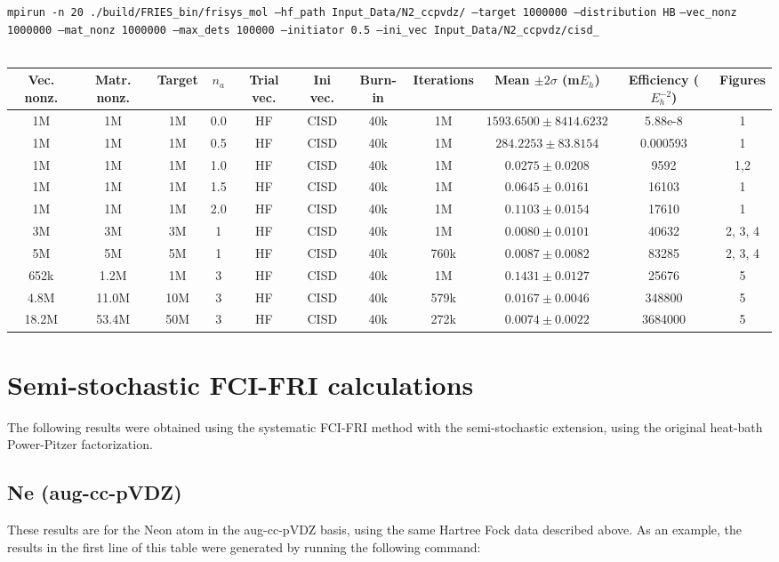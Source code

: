 \documentclass[12pt, landscape]{article}
\begin{document}
\texttt{mpirun -n 20 ./build/FRIES\_bin/frisys\_mol --hf\_path Input\_Data/N2\_ccpvdz/ --target 1000000 --distribution HB} \texttt{--vec\_nonz 1000000 --mat\_nonz 1000000 --max\_dets 100000 --initiator 0.5 --ini\_vec Input\_Data/N2\_ccpvdz/cisd\_}
\\~\\
\begin{tabular}{c|c|c|c|c|c|c|c|c|c|c}
Vec. nonz. & Matr. nonz. & Target & $n_a$ & Trial vec. & Ini vec. & Burn-in & Iterations & Mean $\pm 2 \sigma$ (m$E_h$) & Efficiency ($E_h^{-2}$) & Figures \\ \hline
1M & 1M & 1M & 0.0 & HF & CISD & 40k & 1M & $1593.6500 \pm 8414.6232$ & 5.88e-8 & 1 \\
1M & 1M & 1M & 0.5 & HF & CISD & 40k & 1M & $284.2253 \pm 83.8154$ & 0.000593 & 1 \\
1M & 1M & 1M & 1.0 & HF & CISD & 40k & 1M & $0.0275 \pm 0.0208$ & 9592 & 1,2 \\
1M & 1M & 1M & 1.5 & HF & CISD & 40k & 1M & $0.0645 \pm 0.0161$ & 16103 & 1 \\
1M & 1M & 1M & 2.0 & HF & CISD & 40k & 1M & $0.1103 \pm 0.0154$ & 17610 & 1 \\
3M & 3M & 3M & 1 & HF & CISD & 40k & 1M & $0.0080 \pm 0.0101$ & 40632 & 2, 3, 4\\
5M & 5M & 5M & 1 & HF & CISD & 40k & 760k & $0.0087 \pm 0.0082$ & 83285 & 2, 3, 4\\
652k & 1.2M & 1M &  3 & HF & CISD & 40k & 1M & $0.1431 \pm 0.0127$ & 25676 & 5 \\
4.8M & 11.0M & 10M & 3 & HF & CISD & 40k & 579k & $0.0167 \pm 0.0046$ & 348800 & 5 \\
18.2M & 53.4M & 50M & 3 & HF & CISD & 40k & 272k & $0.0074 \pm 0.0022$ & 3684000 & 5\\
\end{tabular}

\section*{Semi-stochastic FCI-FRI calculations}

The following results were obtained using the systematic FCI-FRI method with the semi-stochastic extension, using the original heat-bath Power-Pitzer factorization. 

\subsection*{Ne (aug-cc-pVDZ)}
These results are for the Neon atom in the aug-cc-pVDZ basis, using the same Hartree Fock data described above. As an example, the results in the first line of this table were generated by running the following command:
\end{document}
